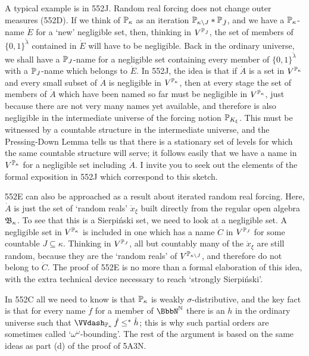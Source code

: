 {A typical example is in 552J.    Random real forcing does not change outer
measures (552D).   If we think of $\Bbb P_{\kappa}$ as an iteration
$\Bbb P_{\kappa\setminus J}*\Bbb P_{\check J}$, and we have a
$\Bbb P_{\kappa}$-name $\dot E$ for a `new' negligible set, then, thinking
in $V^{\Bbb P_{\check J}}$,
the set of members of $\{0,1\}^{\check\lambda}$ contained in
$\dot E$ will have to be negligible.
Back in the ordinary universe, we shall
have a $\Bbb P_J$-name for a negligible set containing every member of
$\{0,1\}^{\check\lambda}$ with a $\Bbb P_J$-name which belongs to $\dot E$.
In 552J, the idea is that if $\dot A$ is a set in
$V^{\Bbb P_{\kappa}}$ and every small subset of $\dot A$ is negligible
in $V^{\Bbb P_{\kappa}}$,
then at every stage the set of members of $\dot A$ which have
been named so far must be negligible in $V^{\Bbb P_{\kappa}}$,
just because there are not very
many names yet available, and therefore is also negligible
in the intermediate universe of the forcing notion $\Bbb P_{K_{\xi}}$.
This must be witnessed by a countable structure
in the intermediate universe, and the Pressing-Down Lemma tells us that
there is a stationary set of levels for which the same countable structure
will serve;  it follows easily that we have a name in $V^{\Bbb P_{\kappa}}$
for a negligible set including $\dot A$.   I invite you to seek out the
elements of the formal exposition in 552J which correspond to this
sketch.

552E can also be approached as a result about iterated random real forcing.
Here, $\dot A$ is just the set of `random reals' $\dot x_{\xi}$ built
directly from the regular open algebra $\frak B_{\kappa}$.   To see that
this is a Sierpi\'nski set, we need to look at a negligible set.   A
negligible set in
$V^{\Bbb P_{\kappa}}$ is included in one which has a name $\dot C$ in
$V^{\Bbb P_J}$ for some countable $J\subseteq\kappa$.   Thinking in
$V^{\Bbb P_J}$, all but countably many of the $\dot x_{\xi}$ are still
random, because they are the `random reals' of
$V^{\Bbb P_{\kappa\setminus J}}$, and therefore do not belong to $\dot C$.
The proof of 552E is no more than a formal elaboration of this idea, with
the extra technical device necessary to reach `strongly Sierpi\'nski'.

In 552C all we need to know is that $\Bbb P_{\kappa}$ is weakly
$\sigma$-distributive, and the key fact is that for every name $\dot f$ for
a member of $\BbbN^{\Bbb N}$ there is an $h$ in the ordinary universe such
that $\VVdPk\,\dot f\le^*\check h$;
this is why such partial orders are sometimes
called `$\omega^{\omega}$-bounding'.    The rest of the argument is
based on the same ideas as part (d) of the proof of 5A3N.

}
